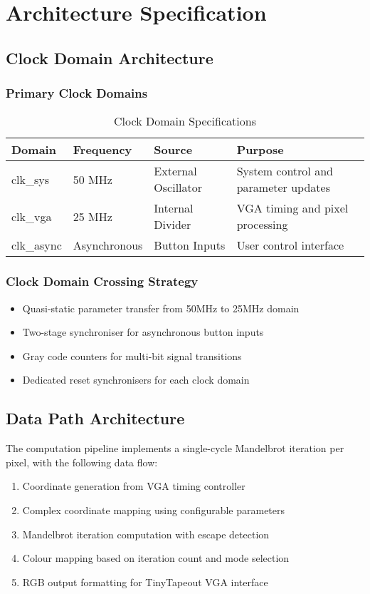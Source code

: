 \documentclass[11pt,a4paper]{article}
\begin{document}
\newpage
\section{Architecture Specification}

\subsection{Clock Domain Architecture}

\subsubsection{Primary Clock Domains}
\begin{table}[h]
\centering
\begin{tabularx}{\textwidth}{|l|l|l|X|}
\hline
\rowcolor{darkgreen!20}
\textbf{Domain} & \textbf{Frequency} & \textbf{Source} & \textbf{Purpose} \\
\hline
clk\_sys & 50 MHz & External Oscillator & System control and parameter updates \\
clk\_vga & 25 MHz & Internal Divider & VGA timing and pixel processing \\
clk\_async & Asynchronous & Button Inputs & User control interface \\
\hline
\end{tabularx}
\caption{Clock Domain Specifications}
\end{table}

\subsubsection{Clock Domain Crossing Strategy}
\begin{itemize}
\item Quasi-static parameter transfer from 50MHz to 25MHz domain
\item Two-stage synchroniser for asynchronous button inputs
\item Gray code counters for multi-bit signal transitions
\item Dedicated reset synchronisers for each clock domain
\end{itemize}

\subsection{Data Path Architecture}
The computation pipeline implements a single-cycle Mandelbrot iteration per pixel, with the following data flow:
\begin{enumerate}
\item Coordinate generation from VGA timing controller
\item Complex coordinate mapping using configurable parameters
\item Mandelbrot iteration computation with escape detection
\item Colour mapping based on iteration count and mode selection
\item RGB output formatting for TinyTapeout VGA interface
\end{enumerate}
\end{document}
